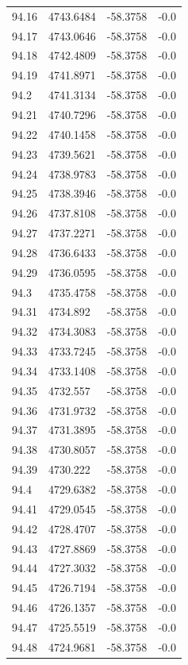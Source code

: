 \begin{table}[H]
\begin{tabular}{llll}
94.16 & 4743.6484 & -58.3758 & -0.0 \\
94.17 & 4743.0646 & -58.3758 & -0.0 \\
94.18 & 4742.4809 & -58.3758 & -0.0 \\
94.19 & 4741.8971 & -58.3758 & -0.0 \\
94.2 & 4741.3134 & -58.3758 & -0.0 \\
94.21 & 4740.7296 & -58.3758 & -0.0 \\
94.22 & 4740.1458 & -58.3758 & -0.0 \\
94.23 & 4739.5621 & -58.3758 & -0.0 \\
94.24 & 4738.9783 & -58.3758 & -0.0 \\
94.25 & 4738.3946 & -58.3758 & -0.0 \\
94.26 & 4737.8108 & -58.3758 & -0.0 \\
94.27 & 4737.2271 & -58.3758 & -0.0 \\
94.28 & 4736.6433 & -58.3758 & -0.0 \\
94.29 & 4736.0595 & -58.3758 & -0.0 \\
94.3 & 4735.4758 & -58.3758 & -0.0 \\
94.31 & 4734.892 & -58.3758 & -0.0 \\
94.32 & 4734.3083 & -58.3758 & -0.0 \\
94.33 & 4733.7245 & -58.3758 & -0.0 \\
94.34 & 4733.1408 & -58.3758 & -0.0 \\
94.35 & 4732.557 & -58.3758 & -0.0 \\
94.36 & 4731.9732 & -58.3758 & -0.0 \\
94.37 & 4731.3895 & -58.3758 & -0.0 \\
94.38 & 4730.8057 & -58.3758 & -0.0 \\
94.39 & 4730.222 & -58.3758 & -0.0 \\
94.4 & 4729.6382 & -58.3758 & -0.0 \\
94.41 & 4729.0545 & -58.3758 & -0.0 \\
94.42 & 4728.4707 & -58.3758 & -0.0 \\
94.43 & 4727.8869 & -58.3758 & -0.0 \\
94.44 & 4727.3032 & -58.3758 & -0.0 \\
94.45 & 4726.7194 & -58.3758 & -0.0 \\
94.46 & 4726.1357 & -58.3758 & -0.0 \\
94.47 & 4725.5519 & -58.3758 & -0.0 \\
94.48 & 4724.9681 & -58.3758 & -0.0 \\

\end{tabular}
\end{table}
